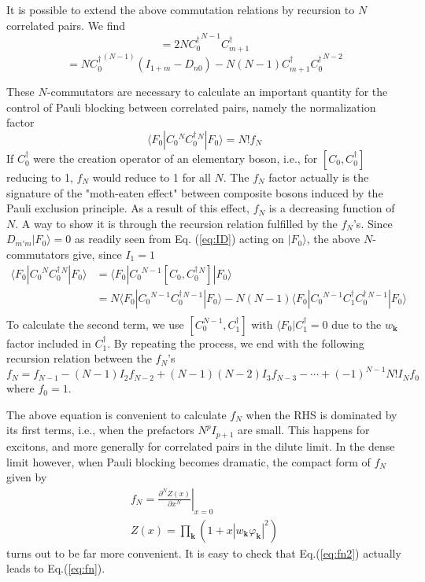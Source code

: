 \documentclass[aps,prb,preprint,groupedaddress,amsmath]{revtex4-1}
\newcommand{\vk}{\ensuremath{\mathbf{k}}}
\newcommand{\dg}{\ensuremath{\dagger}}
\begin{document}
  It is possible to extend the above commutation relations by recursion to $N$ correlated pairs.  We find
\begin{equation}
[{D}_{m0},C^\dg_{0}{}^N]=2N{C^\dg_{0}}^{N-1}C^\dg_{m+1}
\end{equation}
\begin{equation}
[{C}_{m},C^\dg_{0}{}^N]=N{C^\dg_0}^{(N-1)}(I_{1+m}-D_{n0})-N(N-1)C^\dg_{m+1}{C^\dg_{0}}^{N-2}
\end{equation}

These $N$-commutators are necessary to calculate an important quantity for the control of Pauli blocking between correlated pairs, namely the normalization factor
\begin{equation}
\langle{}F_0|{C_0^{ }}{}^N{C_0^\dg}{}^N|F_0{\rangle}=N!f_N
\end{equation}
If $C^\dg_0$ were the creation operator of an elementary boson, i.e., for $[C_0,C^\dg_0]$ reducing to 1,  $f_N$ would reduce to 1 for all $N$.  The $f_N$ factor actually is the signature of the "moth-eaten effect" between composite bosons induced by the Pauli exclusion principle.  As a result of this effect, $f_N$ is a decreasing function of $N$. A way to show it is through  the recursion relation fulfilled by the $f_N$'s.  Since $D_{m'm}|F_0\rangle=0 $  as readily seen from Eq. (\ref{eq:ID}) acting on $|F_0\rangle$, the above $N$-commutators give,  since $I_1=1$ 
\begin{equation}
\begin{split} 
\langle{}F_0|{C_0^{ }}{}^N{C_0^\dg}{}^N|F_0{\rangle}&
	=\langle{}F_0|{C_0^{ }}{}^{N-1}[C_0,{C_0^\dg}{}^N]|F_0{\rangle}\\
	&=N\langle{}F_0|{C_0^{ }}{}^{N-1}{C_0^\dg}{}^{N-1}|F_0{\rangle}
	-N(N-1)\langle{}F_0|{C_0^{ }}{}^{N-1}C_1^\dg{C_0^\dg}{}^{N-1}|F_0{\rangle}\\
\end{split}
\end{equation}
To calculate the second term, we  use $[C_0^{N-1},C_1^\dg]$ with $\langle{}F_0|C^\dg_1=0$ due to the $w_\vk$ factor included in $C^\dg_1$. By repeating the process, we end with the following recursion relation between the $f_N$'s 
\begin{equation}\label{eq:fn}
f_N=f_{N-1}-(N-1)I_2f_{N-2}+(N-1)(N-2)I_3f_{N-3}-\cdots+(-1)^{N-1}N!I_Nf_0
\end{equation}
where $f_0=1$. 

The above equation is convenient to calculate $f_N$ when the RHS is dominated by its first terms, i.e., when the prefactors $N^pI_{p+1}$ are small.  This happens for excitons,  and more generally for correlated pairs in the dilute limit.  In the dense limit however, when Pauli blocking becomes dramatic, the compact form of  $f_N$   given by 
\begin{equation}\label{eq:fn2}
\begin{split}
f_N=\left.\frac{\partial^NZ(x)}{\partial{x^N}}\right|_{x=0}\\
Z(x)=\prod_\vk(1+x|w_\vk\varphi_\vk|^2)
\end{split}
\end{equation}
turns out to be far more convenient. It is easy to check that Eq.(\ref{eq:fn2}) actually leads to Eq.(\ref{eq:fn}).
\end{document}
